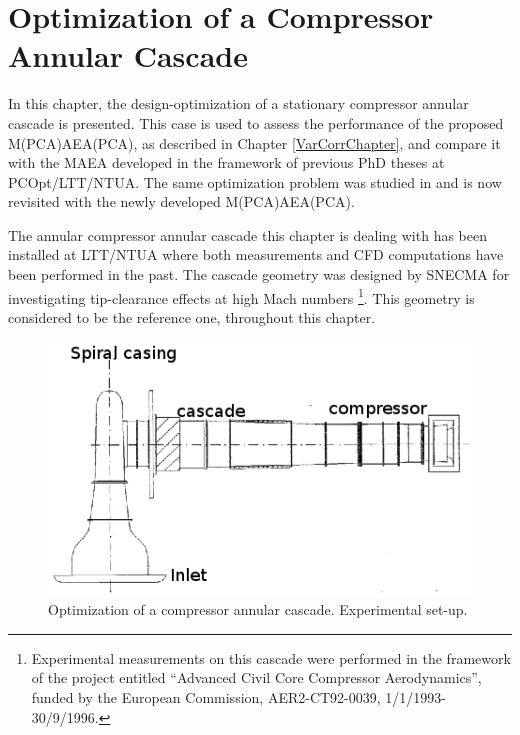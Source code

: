 \ifpdf
    \graphicspath{{6/figures/PNG/}{6/figures/PDF/}{6/figures/}}
\else
    \graphicspath{{6/figures/EPS/}{6/figures/}}
\fi


\chapter{Optimization of a Compressor Annular Cascade} %



In this chapter, the design-optimization of a stationary compressor annular cascade is presented. This case is used to assess the performance of the proposed M(PCA)AEA(PCA), as described in Chapter \ref{VarCorrChapter}, and compare it with the MAEA developed in the framework of previous PhD theses \cite{phd_Kampolis,phd_Giotis,phd_Karakasis} at PCOpt/LTT/NTUA. The same optimization problem was studied in \cite{phd_Kampolis} and is now revisited with the newly developed M(PCA)AEA(PCA). 

The annular compressor annular cascade this chapter is dealing with has been installed at LTT/NTUA where both measurements  \cite{phd_doukelis,mathiou97}  and CFD computations \cite{politis98a} have been performed in the past. The cascade geometry was designed by SNECMA for investigating tip-clearance effects at high Mach numbers \footnote{Experimental measurements on this cascade were performed in the framework of the project entitled ``Advanced Civil Core Compressor Aerodynamics'', funded by the European Commission, AER2-CT92-0039, 1/1/1993-30/9/1996.}. This geometry is considered to be the reference one, throughout this chapter. 

\begin{figure}[h!]
\centering
\includegraphics[width=.8\textwidth]{experim.eps}
\caption{Optimization of a compressor annular cascade. Experimental set-up.}
\label{ntua_blade.experim}
\end{figure}


